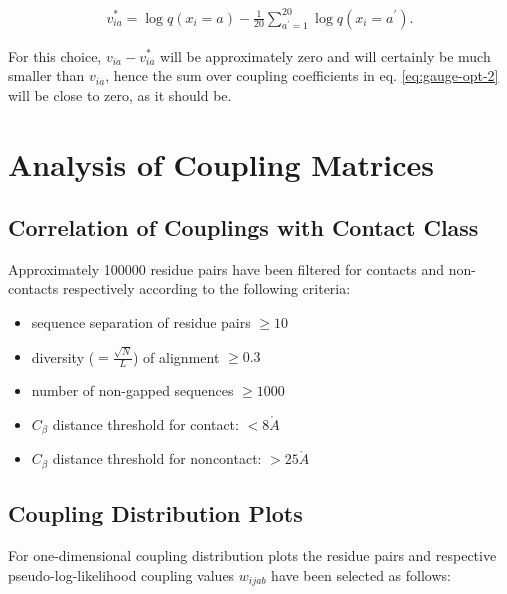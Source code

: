 \documentclass[11pt,a4paper,twoside]{book}
\providecommand{\tightlist}{%
  \setlength{\itemsep}{0pt}\setlength{\parskip}{0pt}}
\newcommand{\Cb}{C_\beta}
\newcommand{\eq}{\!=\!}
\newcommand{\via}{v_{ia}}
\newcommand{\wijab}{w_{ijab}}
\newcommand{\angstrom}{\mathring{A} \;}
\theoremstyle{definition}
\theoremstyle{definition}
\theoremstyle{remark}
\begin{document}
\begin{align}
\via^* = \log q(x_i \eq a) - \frac{1}{20} \sum_{a^{\prime}=1}^{20} \log q(x_i \eq a^{\prime}) .
\label{eq:prior-v}
\end{align}

For this choice, \(\via - \via^*\) will be approximately zero and will
certainly be much smaller than \(\via\), hence the sum over coupling
coefficients in eq. \eqref{eq:gauge-opt-2} will be close to zero, as it
should be.

\section{Analysis of Coupling
Matrices}\label{analysis-of-coupling-matrices}

\subsection{Correlation of Couplings with Contact
Class}\label{method-coupling-correlation}

Approximately 100000 residue pairs have been filtered for contacts and
non-contacts respectively according to the following criteria:

\begin{itemize}
\tightlist
\item
  sequence separation of residue pairs \(\ge 10\)
\item
  diversity (\(=\frac{\sqrt{N}}{L}\)) of alignment \(\ge 0.3\)
\item
  number of non-gapped sequences \(\ge 1000\)
\item
  \(\Cb\) distance threshold for contact: \(<8\angstrom\)
\item
  \(\Cb\) distance threshold for noncontact: \(>25\angstrom\)
\end{itemize}

\subsection{Coupling Distribution Plots}\label{method-coupling-profile}

For one-dimensional coupling distribution plots the residue pairs and
respective pseudo-log-likelihood coupling values \(\wijab\) have been
selected as follows:
\end{document}
